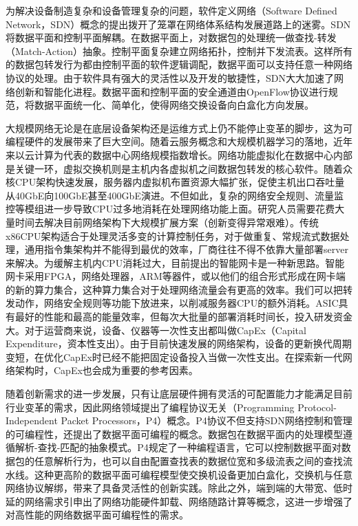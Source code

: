 为解决设备制造复杂和设备管理复杂的问题，软件定义网络（Software Defined Network，SDN）概念的提出拨开了笼罩在网络体系结构发展道路上的迷雾。SDN将数据平面和控制平面解耦。在数据平面上，对数据包的处理统一做查找-转发（Match-Action）抽象。控制平面复杂建立网络拓扑，控制并下发流表。这样所有的数据包转发行为都由控制平面的软件逻辑调配，数据平面可以支持任意一种网络协议的处理。由于软件具有强大的灵活性以及开发的敏捷性，SDN大大加速了网络创新和智能化进程。数据平面和控制平面的安全通道由OpenFlow协议进行规范，将数据平面统一化、简单化，使得网络交换设备向白盒化方向发展。	

大规模网络无论是在底层设备架构还是运维方式上仍不能停止变革的脚步，这为可编程硬件的发展带来了巨大空间。随着云服务概念和大规模机器学习的落地，近年来以云计算为代表的数据中心网络规模指数增长。网络功能虚拟化在数据中心内部是关键一环，虚拟交换机则是主机内各虚拟机之间数据包转发的核心软件。随着众核CPU架构快速发展，服务器内虚拟机布置资源大幅扩张，促使主机出口吞吐量从40GbE向100GbE甚至400GbE演进。不但如此，复杂的网络安全规则、流量监控等模组进一步导致CPU过多地消耗在处理网络功能上面。研究人员需要花费大量时间去解决目前网络架构下大规模扩展方案（创新变得异常艰难）。传统x86CPU架构适合于处理灵活多变的计算控制任务，对于做重复、常规流式数据处理，通用指令集架构并不能得到最优的效率，厂商往往不得不依靠大量部署server来解决。为缓解主机内CPU消耗过大，目前提出的智能网卡是一种新思路。智能网卡采用FPGA，网络处理器，ARM等器件，或以他们的组合形式形成在网卡端的新的算力集合，这种算力集合对于处理网络流量会有更高的效率。我们可以把转发动作，网络安全规则等功能下放进来，以削减服务器CPU的额外消耗。ASIC具有最好的性能和最高的能量效率，但每次大批量的部署消耗时间长，投入研发资金大。对于运营商来说，设备、仪器等一次性支出都叫做CapEx（Capital Expenditure，资本性支出）。由于目前快速发展的网络架构，设备的更新换代周期变短，在优化CapEx时已经不能把固定设备投入当做一次性支出。在探索新一代网络架构时，CapEx也会成为重要的参考因素。

随着创新需求的进一步发展，只有让底层硬件拥有灵活的可配置能力才能满足目前行业变革的需求，因此网络领域提出了编程协议无关（Programming Protocol-Independent Packet Processors，P4）概念。P4协议不但支持SDN网络控制和管理的可编程性，还提出了数据平面可编程的概念。数据包在数据平面内的处理模型遵循解析-查找-匹配的抽象模式。P4规定了一种编程语言，它可以控制数据平面对数据包的任意解析行为，也可以自由配置查找表的数据位宽和多级流表之间的查找流水线。这种更高阶的数据平面可编程模型使交换机设备更加白盒化，交换机与任意网络协议解绑，带来了具备灵活性的创新实践。除此之外，端到端的大带宽、低时延的网络需求引申出了网络功能硬件卸载、网络随路计算等概念，这进一步增强了对高性能的网络数据平面可编程性的需求。

